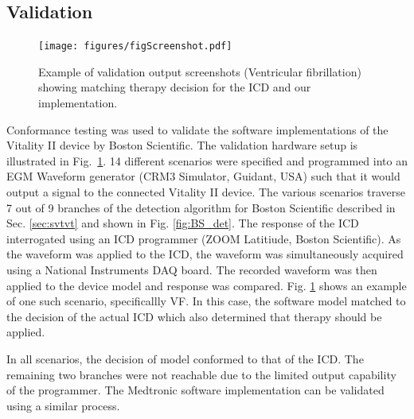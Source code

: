 \subsection{Validation}
\label{sec:validation}

\begin{figure}[t ]
	\centering
	\texttt{[image: figures/figScreenshot.pdf]}
	\caption{\small Example of validation output screenshots (Ventricular fibrillation) showing matching therapy decision for the ICD and our implementation.}
	\label{fig:validation}
\end{figure}

Conformance testing was used to validate the software implementations of the Vitality II device by Boston Scientific. 
The validation hardware setup is illustrated in Fig.~\ref{fig:validation}. 
14 different scenarios were specified and programmed into an EGM Waveform generator (CRM3 Simulator, Guidant, USA) such that it would output a signal to the connected Vitality II device.
The various scenarios traverse 7 out of 9 branches of the detection algorithm for Boston Scientific described in Sec. \ref{sec:svtvt} and shown in Fig. \ref{fig:BS_det}. 
The response of the ICD interrogated using an ICD programmer (ZOOM Latitiude, Boston Scientific).
As the waveform was applied to the ICD, the waveform was simultaneously acquired using a National Instruments DAQ board.
The recorded waveform was then applied to the device model and response was compared.
Fig. \ref{fig:validation} shows an example of one such scenario, specificallly VF. 
In this case, the software model matched to the decision of the actual ICD which also determined that therapy should be applied.

In all scenarios, the decision of model conformed to that of the ICD. 
The remaining two branches were not reachable due to the limited output capability of the programmer.
The Medtronic software implementation can be validated using a similar process.


